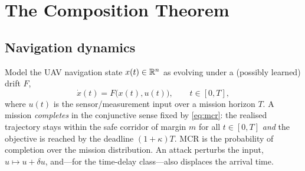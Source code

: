 \section{The Composition Theorem}
\label{sec:theorem}
\subsection{Navigation dynamics}
Model the UAV navigation state $x(t)\in\mathbb{R}^n$ as evolving under a (possibly
learned) drift $F$,
\begin{equation}
\label{eq:ode}
\dot{x}(t) = F\big(x(t), u(t)\big), \qquad t\in[0,T],
\end{equation}
where $u(t)$ is the sensor/measurement input over a mission horizon $T$. A
mission \emph{completes} in the conjunctive sense fixed by \eqref{eq:mcr}: the
realised trajectory stays within the safe corridor of margin $m$ for all
$t\in[0,T]$ \emph{and} the objective is reached by the deadline $(1+\kappa)T$.
MCR is the probability of completion over the mission distribution. An attack
perturbs the input, $u\mapsto u+\delta u$, and---for the time-delay class---also
displaces the arrival time.


